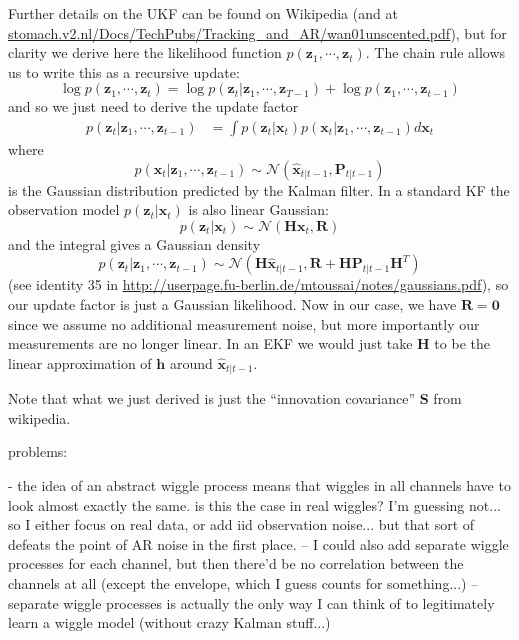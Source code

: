 \documentclass{article}
\begin{document}
Further details on the UKF can be found on Wikipedia (and at \url{stomach.v2.nl/Docs/TechPubs/Tracking_and_AR/wan01unscented.pdf}), but for clarity we derive here the likelihood function $p(\mathbf{z}_1, \cdots, \mathbf{z}_t)$. The chain rule allows us to write this as a recursive update:
\[\log p(\mathbf{z}_1, \cdots, \mathbf{z}_t) = \log p(\mathbf{z}_t | \mathbf{z}_1, \cdots, \mathbf{z}_{T-1}) + \log p(\mathbf{z}_1, \cdots, \mathbf{z}_{t-1})\]
and so we just need to derive the update factor
\begin{align*}
p(\mathbf{z}_t | \mathbf{z}_1, \cdots, \mathbf{z}_{t-1}) &= \int p(\mathbf{z}_t | \mathbf{x}_t) p(\mathbf{x}_t | \mathbf{z}_1, \cdots, \mathbf{z}_{t-1})d\mathbf{x}_t
\end{align*} 
where \[p(\mathbf{x}_t | \mathbf{z}_1, \cdots, \mathbf{z}_{t-1}) \sim \mathcal{N}\left(\hat{\mathbf{x}}_{t|t-1}, \mathbf{P}_{t|t-1}\right)\]
 is the Gaussian distribution predicted by the Kalman filter. In a standard KF the observation model $p(\mathbf{z}_t | \mathbf{x}_t)$ is also linear Gaussian:
\[p(\mathbf{z}_t | \mathbf{x}_t) \sim \mathcal{N}\left( \mathbf{H}\mathbf{x}_t, \mathbf{R} \right)\]
and the integral gives a Gaussian density \[p(\mathbf{z}_t | \mathbf{z}_1, \cdots, \mathbf{z}_{t-1}) \sim \mathcal{N}\left( \mathbf{H} \hat{\mathbf{x}}_{t|t-1}, \mathbf{R} + \mathbf{H}\mathbf{P}_{t|t-1}\mathbf{H}^T\right)\]
(see identity 35 in \url{http://userpage.fu-berlin.de/mtoussai/notes/gaussians.pdf}), so our update factor is just a Gaussian likelihood. Now in our case, we have $\mathbf{R}=\mathbf{0}$ since we assume no additional measurement noise, but more importantly our measurements are no longer linear. In an EKF we would just take $\mathbf{H}$ to be the linear approximation of $\mathbf{h}$ around $\hat{\mathbf{x}}_{t|t-1}$.

Note that what we just derived is just the ``innovation covariance'' $\mathbf{S}$ from wikipedia. 


problems:

- the idea of an abstract wiggle process means that wiggles in all channels have to look almost exactly the same. is this the case in real wiggles? I'm guessing not... so I either focus on real data, or add iid observation noise... but that sort of defeats the point of AR noise in the first place. 
-- I could also add separate wiggle processes for each channel, but then there'd be no correlation between the channels at all (except the envelope, which I guess counts for something...)
-- separate wiggle processes is actually the only way I can think of to legitimately learn a wiggle model (without crazy Kalman stuff...)
\end{document}
